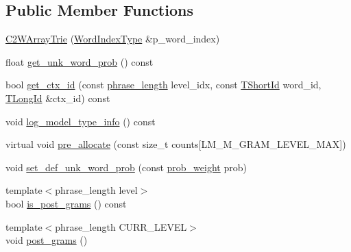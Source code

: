 \subsection*{Public Member Functions}
\begin{DoxyCompactItemize}
\item 
\hyperlink{classuva_1_1smt_1_1bpbd_1_1server_1_1lm_1_1_c2_w_array_trie_a39ab5ec7aca3d70403904417b4d27e0c}{C2\+W\+Array\+Trie} (\hyperlink{classuva_1_1smt_1_1bpbd_1_1server_1_1lm_1_1_word_index_trie_base_a77ee32bf3a9f8a89558bda4f2031200c}{Word\+Index\+Type} \&p\+\_\+word\+\_\+index)
\item 
float \hyperlink{classuva_1_1smt_1_1bpbd_1_1server_1_1lm_1_1_c2_w_array_trie_afd05d13ddbbab0ae1463bcc9a103a47f}{get\+\_\+unk\+\_\+word\+\_\+prob} () const 
\item 
bool \hyperlink{classuva_1_1smt_1_1bpbd_1_1server_1_1lm_1_1_c2_w_array_trie_a71d902c40add0bdd3d4dce42927cddeb}{get\+\_\+ctx\+\_\+id} (const \hyperlink{namespaceuva_1_1smt_1_1bpbd_1_1server_af068a19c2e03116caf3e3827a3e40e35}{phrase\+\_\+length} level\+\_\+idx, const \hyperlink{namespaceuva_1_1smt_1_1bpbd_1_1server_1_1lm_1_1identifiers_a33043a191e9a637dea742a89d23c8bdc}{T\+Short\+Id} word\+\_\+id, \hyperlink{namespaceuva_1_1smt_1_1bpbd_1_1server_1_1lm_1_1identifiers_a6841847096e455ad3c38689bc548b3b0}{T\+Long\+Id} \&ctx\+\_\+id) const 
\item 
void \hyperlink{classuva_1_1smt_1_1bpbd_1_1server_1_1lm_1_1_c2_w_array_trie_a06dcbd247a9fbe74c1aecc4116b66961}{log\+\_\+model\+\_\+type\+\_\+info} () const 
\item 
virtual void \hyperlink{classuva_1_1smt_1_1bpbd_1_1server_1_1lm_1_1_c2_w_array_trie_a0d2f243eb382260d942e94b0148cf437}{pre\+\_\+allocate} (const size\+\_\+t counts\mbox{[}L\+M\+\_\+\+M\+\_\+\+G\+R\+A\+M\+\_\+\+L\+E\+V\+E\+L\+\_\+\+M\+A\+X\mbox{]})
\item 
void \hyperlink{classuva_1_1smt_1_1bpbd_1_1server_1_1lm_1_1_c2_w_array_trie_a6a6e39d2103a15011dbe42ec2f6fce55}{set\+\_\+def\+\_\+unk\+\_\+word\+\_\+prob} (const \hyperlink{namespaceuva_1_1smt_1_1bpbd_1_1server_a01e9ea4de9c226f4464862e84ff0bbcc}{prob\+\_\+weight} prob)
\item 
{\footnotesize template$<$phrase\+\_\+length level$>$ }\\bool \hyperlink{classuva_1_1smt_1_1bpbd_1_1server_1_1lm_1_1_c2_w_array_trie_a2c8a5e5f29d9cec134b31755f0245a5d}{is\+\_\+post\+\_\+grams} () const 
\item 
{\footnotesize template$<$phrase\+\_\+length C\+U\+R\+R\+\_\+\+L\+E\+V\+E\+L$>$ }\\void \hyperlink{classuva_1_1smt_1_1bpbd_1_1server_1_1lm_1_1_c2_w_array_trie_a335064e36215d2104297ff2644372cd1}{post\+\_\+grams} ()

\end{DoxyCompactItemize}
